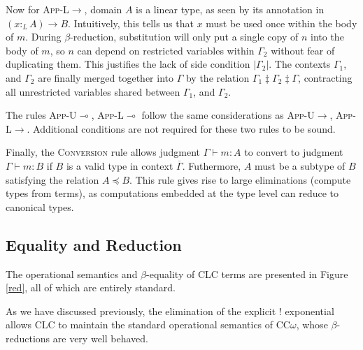 \documentclass[sigplan,screen,review,authordraft]{acmart}
\newcommand{\rname}[1]{\textsc{\footnotesize #1}}
\newcommand{\pure}[1]{|#1|}
\newcommand{\ltype}{:_{\scriptscriptstyle L}}
\newcommand{\mrg}[3]{#1\ddagger#2\ddagger#3}
\begin{document}
Now for \rname{App-L$\rightarrow$}, domain $A$ is a linear type, as seen by its annotation in $(x \ltype A) \rightarrow B$. Intuitively, this tells us that $x$ must be used once within the body of $m$. During $\beta$-reduction, substitution will only put a single copy of $n$ into the body of $m$, so $n$ can depend on restricted variables within $\Gamma_2$ without fear of duplicating them. This justifies the lack of side condition $\pure{\Gamma_2}$. The contexts $\Gamma_1$, and $\Gamma_2$ are finally merged together into $\Gamma$ by the relation $\mrg{\Gamma_1}{\Gamma_2}{\Gamma}$, contracting all unrestricted variables shared between $\Gamma_1$, and $\Gamma_2$.

The rules \rname{App-U$\multimap$}, \rname{App-L$\multimap$} follow the same considerations as \rname{App-U$\rightarrow$}, \rname{App-L$\rightarrow$}. Additional conditions are not required for these two rules to be sound.

Finally, the \rname{Conversion} rule allows judgment $\Gamma \vdash m : A$ to convert to judgment $\Gamma \vdash m : B$ if $B$ is a valid type in context $\overline{\Gamma}$. Futhermore, $A$ must be a subtype of $B$ satisfying the relation $A \preceq B$. This rule gives rise to large eliminations (compute types from terms), as computations embedded at the type level can reduce to canonical types.

\subsection{Equality and Reduction} \label{reduction}
The operational semantics and $\beta$-equality of CLC terms are presented in Figure \ref{red}, all of which are entirely standard.

As we have discussed previously, the elimination of the explicit ! exponential allows CLC to maintain the standard operational semantics of CC$\omega$, whose $\beta$-reductions are very well behaved.
\end{document}
